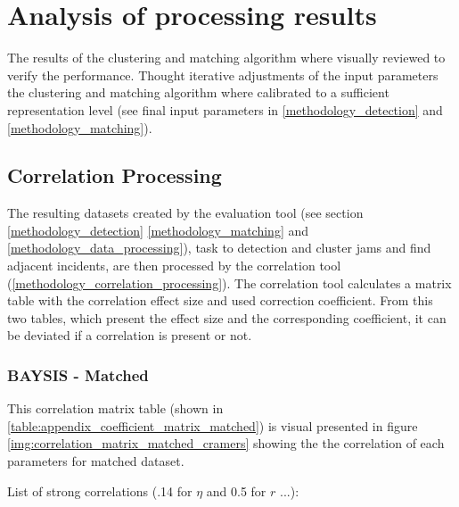 \chapter{Analysis of processing results}
\label{analysis_processing}

The results of the clustering and matching algorithm where visually reviewed to verify the performance. Thought iterative adjustments of the input parameters the clustering and matching algorithm where calibrated to a sufficient representation level (see final input parameters in \autoref{methodology_detection} and \autoref{methodology_matching}).


\section{Correlation Processing}

The resulting datasets created by the evaluation tool (see section \autoref{methodology_detection} \ref{methodology_matching} and \ref{methodology_data_processing}), task to detection and cluster jams and find adjacent incidents, are then processed by the correlation tool (\autoref{methodology_correlation_processing}). The correlation tool calculates a matrix table with the correlation effect size and used correction coefficient. From this two tables, which present the effect size and the corresponding coefficient, it can be deviated if a correlation is present or not.

\subsection{BAYSIS - Matched}

This correlation matrix table (shown in \autoref{table:appendix_coefficient_matrix_matched}) is visual presented in figure \ref{img:correlation_matrix_matched_cramers} showing the the correlation of each parameters for matched dataset. 

List of strong correlations (.14 for $\eta$ and 0.5 for $r$ ...):

